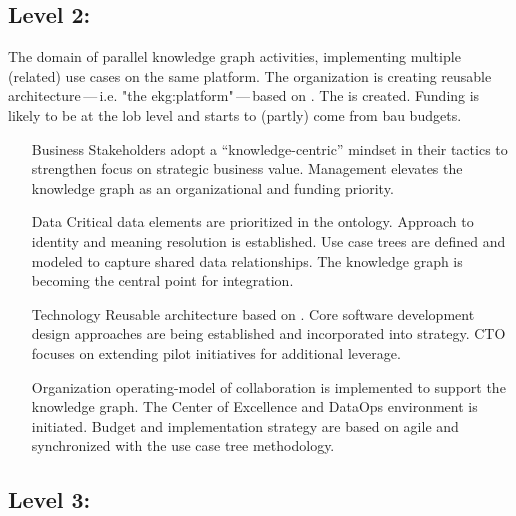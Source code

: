 \subsection{Level 2: \ekgmmLevelTwoLabel}

The domain of parallel knowledge graph activities, implementing multiple (related) use cases on the same platform.
The organization is creating reusable architecture\,---\,i.e. "the \gls{ekg:platform}"\,---\,based
on .
The  is created.
Funding is likely to be at the \gls{lob} level and starts to (partly) come from \gls{bau} budgets.

\begin{itemize}[leftmargin=1in,font=\bfseries]

    \item[Business]     Stakeholders adopt a “knowledge-centric” mindset in their tactics to strengthen focus on
                        strategic business value.
                        Management elevates the knowledge graph as an organizational and funding priority.
    \item[Data]         Critical data elements are prioritized in the ontology.
                        Approach to identity and meaning resolution is established.
                        Use case trees are defined and modeled to capture shared data relationships.
                        The knowledge graph is becoming the central point for integration.
    \item[Technology]   Reusable architecture based on .
                        Core software development design approaches are being established and incorporated
                        into strategy.
                        CTO focuses on extending pilot initiatives for additional leverage.
    \item[Organization] \Gls{operating-model} of collaboration is implemented to support the knowledge graph.
                        The Center of Excellence and DataOps environment is initiated.
                        Budget and implementation strategy are based on agile and synchronized with the
                        use case tree methodology.
\end{itemize}

\subsection{Level 3: \ekgmmLevelThreeLabel}

